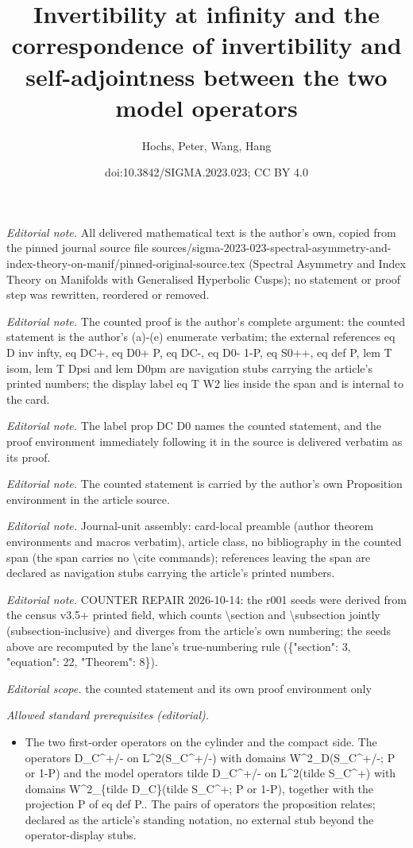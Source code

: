 \documentclass[10pt,a4paper]{article}
\title{Invertibility at infinity and the correspondence of invertibility and self-adjointness between the two model operators}
\author{Hochs, Peter, Wang, Hang}
\date{doi:10.3842/SIGMA.2023.023; CC BY 4.0}
\numberwithin{equation}{section}
\begin{document}
\maketitle
\setcounter{section}{3}
\setcounter{equation}{22}
\setcounter{Theorem}{8}
\noindent\textit{Editorial note.} All delivered mathematical text is the author's own, copied from the pinned journal source file sources/sigma-2023-023-spectral-asymmetry-and-index-theory-on-manif/pinned-original-source.tex (Spectral Asymmetry and Index Theory on Manifolds with Generalised Hyperbolic Cusps); no statement or proof step was rewritten, reordered or removed.\par\medskip
\noindent\textit{Editorial note.} The counted proof is the author's complete argument: the counted statement is the author's (a)-(e) enumerate verbatim; the external references eq D inv infty, eq DC+, eq D0+ P, eq DC-, eq D0- 1-P, eq S0++, eq def P, lem T isom, lem T Dpsi and lem D0pm are navigation stubs carrying the article's printed numbers; the display label eq T W2 lies inside the span and is internal to the card.\par\medskip
\noindent\textit{Editorial note.} The label prop DC D0 names the counted statement, and the proof environment immediately following it in the source is delivered verbatim as its proof.\par\medskip
\noindent\textit{Editorial note.} The counted statement is carried by the author's own Proposition environment in the article source.\par\medskip
\noindent\textit{Editorial note.} Journal-unit assembly: card-local preamble (author theorem environments and macros verbatim), article class, no bibliography in the counted span (the span carries no \textbackslash{}cite commands); references leaving the span are declared as navigation stubs carrying the article's printed numbers.\par\medskip
\noindent\textit{Editorial note.} COUNTER REPAIR 2026-10-14: the r001 seeds were derived from the census v3.5+ printed field, which counts \textbackslash{}section and \textbackslash{}subsection jointly (subsection-inclusive) and diverges from the article's own numbering; the seeds above are recomputed by the lane's true-numbering rule (\{"section": 3, "equation": 22, "Theorem": 8\}).\par\medskip
\noindent\textit{Editorial scope.} the counted statement and its own proof environment only\par\medskip
\noindent\textit{Allowed standard prerequisites (editorial).}\begin{itemize}
\item The two first-order operators on the cylinder and the compact side. The operators D\_C\textasciicircum{}+/- on L\textasciicircum{}2(S\_C\textasciicircum{}+/-) with domains W\textasciicircum{}2\_D(S\_C\textasciicircum{}+/-; P or 1-P) and the model operators tilde D\_C\textasciicircum{}+/- on L\textasciicircum{}2(tilde S\_C\textasciicircum{}+) with domains W\textasciicircum{}2\_\{tilde D\_C\}(tilde S\_C\textasciicircum{}+; P or 1-P), together with the projection P of eq def P.. The pairs of operators the proposition relates; declared as the article's standing notation, no external stub beyond the operator-display stubs.
\end{itemize}\medskip
\end{document}
